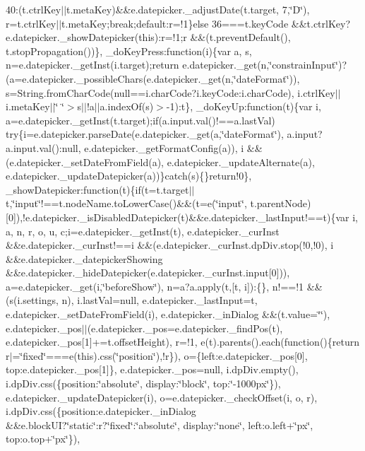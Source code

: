 \begin{DoxyCompactItemize}
40\+:(t.\+ctrl\+Key$\vert$$\vert$t.\+meta\+Key)\&\&e.\+datepicker.\+\_\+adjust\+Date(t.\+target, 7,\char`\"{}\+D\char`\"{}), r=t.\+ctrl\+Key$\vert$$\vert$t.\+meta\+Key;break;default\+:r=!1\}else 36===t.\+key\+Code \&\&t.\+ctrl\+Key?e.\+datepicker.\+\_\+show\+Datepicker(this)\+:r=!1;r \&\&(t.\+prevent\+Default(), t.\+stop\+Propagation())\}, \+\_\+do\+Key\+Press\+:function(i)\{var a, s, n=e.\+datepicker.\+\_\+get\+Inst(i.\+target);return e.\+datepicker.\+\_\+get(n,\char`\"{}constrain\+Input\char`\"{})?(a=e.\+datepicker.\+\_\+possible\+Chars(e.\+datepicker.\+\_\+get(n,\char`\"{}date\+Format\char`\"{})), s=\+String.\+from\+Char\+Code(null==i.\+char\+Code?i.\+key\+Code\+:i.\+char\+Code), i.\+ctrl\+Key$\vert$$\vert$i.\+meta\+Key$\vert$$\vert$\char`\"{} \char`\"{}$>$s$\vert$$\vert$!a$\vert$$\vert$a.\+index\+Of(s)$>$-\/1)\+:t\}, \+\_\+do\+Key\+Up\+:function(t)\{var i, a=e.\+datepicker.\+\_\+get\+Inst(t.\+target);if(a.\+input.\+val()!==a.\+last\+Val) try\{i=e.\+datepicker.\+parse\+Date(e.\+datepicker.\+\_\+get(a,\char`\"{}date\+Format\char`\"{}), a.\+input?a.\+input.\+val()\+:null, e.\+datepicker.\+\_\+get\+Format\+Config(a)), i \&\&(e.\+datepicker.\+\_\+set\+Date\+From\+Field(a), e.\+datepicker.\+\_\+update\+Alternate(a), e.\+datepicker.\+\_\+update\+Datepicker(a))\}catch(s)\{\}return!0\}, \+\_\+show\+Datepicker\+:function(t)\{if(t=t.\+target$\vert$$\vert$t,\char`\"{}input\char`\"{}!==t.\+node\+Name.\+to\+Lower\+Case()\&\&(t=e(\char`\"{}input\char`\"{}, t.\+parent\+Node)\mbox{[}0\mbox{]}),!e.\+datepicker.\+\_\+is\+Disabled\+Datepicker(t)\&\&e.\+datepicker.\+\_\+last\+Input!==t)\{var i, a, n, r, o, u, c;i=e.\+datepicker.\+\_\+get\+Inst(t), e.\+datepicker.\+\_\+cur\+Inst \&\&e.\+datepicker.\+\_\+cur\+Inst!==i \&\&(e.\+datepicker.\+\_\+cur\+Inst.\+dp\+Div.\+stop(!0,!0), i \&\&e.\+datepicker.\+\_\+datepicker\+Showing \&\&e.\+datepicker.\+\_\+hide\+Datepicker(e.\+datepicker.\+\_\+cur\+Inst.\+input\mbox{[}0\mbox{]})), a=e.\+datepicker.\+\_\+get(i,\char`\"{}before\+Show\char`\"{}), n=a?a.\+apply(t,\mbox{[}t, i\mbox{]})\+:\{\}, n!==!1 \&\&(s(i.\+settings, n), i.\+last\+Val=null, e.\+datepicker.\+\_\+last\+Input=t, e.\+datepicker.\+\_\+set\+Date\+From\+Field(i), e.\+datepicker.\+\_\+in\+Dialog \&\&(t.\+value=\char`\"{}\char`\"{}), e.\+datepicker.\+\_\+pos$\vert$$\vert$(e.\+datepicker.\+\_\+pos=e.\+datepicker.\+\_\+find\+Pos(t), e.\+datepicker.\+\_\+pos\mbox{[}1\mbox{]}+=t.\+offset\+Height), r=!1, e(t).\+parents().\+each(function()\{return r$\vert$=\char`\"{}fixed\char`\"{}===e(this).\+css(\char`\"{}position\char`\"{}),!r\}), o=\{left\+:e.\+datepicker.\+\_\+pos\mbox{[}0\mbox{]}, top\+:e.\+datepicker.\+\_\+pos\mbox{[}1\mbox{]}\}, e.\+datepicker.\+\_\+pos=null, i.\+dp\+Div.\+empty(), i.\+dp\+Div.\+css(\{position\+:\char`\"{}absolute\char`\"{}, display\+:\char`\"{}block\char`\"{}, top\+:\char`\"{}-\/1000px\char`\"{}\}), e.\+datepicker.\+\_\+update\+Datepicker(i), o=e.\+datepicker.\+\_\+check\+Offset(i, o, r), i.\+dp\+Div.\+css(\{position\+:e.\+datepicker.\+\_\+in\+Dialog \&\&e.\+block\+U\+I?\char`\"{}static\char`\"{}\+:r?\char`\"{}fixed\char`\"{}\+:\char`\"{}absolute\char`\"{}, display\+:\char`\"{}none\char`\"{}, left\+:o.\+left+\char`\"{}px\char`\"{}, top\+:o.\+top+\char`\"{}px\char`\"{}\}), 
\end{DoxyCompactItemize}

